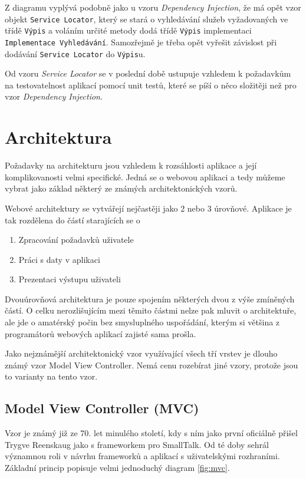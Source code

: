 \documentclass[11pt,twoside,a4paper]{book}
\begin{document}
Z diagramu vyplývá podobně jako u vzoru \textit{Dependency Injection}, že má opět vzor objekt \texttt{Service Locator}, který se stará o vyhledávání služeb vyžadovaných ve třídě \texttt{Výpis} a voláním určité metody dodá třídě \texttt{Výpis} implementaci \texttt{Implementace Vyhledávání}. Samozřejmě je třeba opět vyřešit závislost při dodávání \texttt{Service Locator} do \texttt{Výpis}u. 

Od vzoru \textit{Service Locator} se v poslední době ustupuje vzhledem k požadavkům na testovatelnost aplikací pomocí unit testů, které se píší o něco složitěji než pro vzor \textit{Dependency Injection}. 




\section{Architektura}
Požadavky na architekturu jsou vzhledem k rozsáhlosti aplikace a její komplikovanosti velmi specifické. Jedná se o webovou aplikaci a tedy můžeme vybrat jako základ některý ze známých architektonických vzorů. 

\begin{samepage}
Webové architektury se vytvářejí nejčastěji jako 2 nebo 3 úrovňové. Aplikace je tak rozdělena do částí starajících se o 

\begin{enumerate}
\item Zpracování požadavků uživatele
\item Práci s daty v aplikaci
\item Prezentaci výstupu uživateli
\end{enumerate}
\end{samepage}

Dvouúrovňová architektura je pouze spojením některých dvou z výše zmíněných částí. O celku nerozlišujícím mezi těmito částmi nelze pak mluvit o architektuře, ale jde o amatérský počin bez smysluplného uspořádání, kterým si většina z programátorů webových aplikací zajisté sama prošla.

Jako nejznámější architektonický vzor využívající všech tří vrstev je dlouho známý vzor Model View Controller. Nemá cenu rozebírat jiné vzory, protože jsou to varianty na tento vzor.

\subsection{Model View Controller (MVC)}
\label{mvc}
Vzor je známý již ze 70. let minulého století, kdy s ním jako první oficiálně přišel Trygve Reenskaug jako s frameworkem pro SmallTalk. Od té doby sehrál významnou roli v návrhu frameworků a aplikací s uživatelskými rozhraními\citep{PEAA}. Základní princip popisuje velmi jednoduchý diagram \ref{fig:mvc}.
\end{document}
